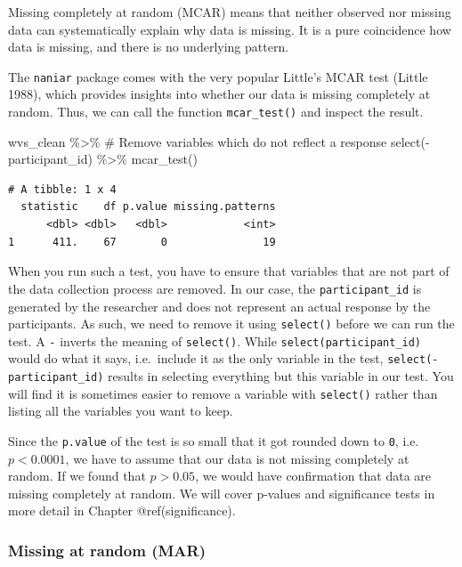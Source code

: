 \documentclass[
  letterpaper,
]{krantz}
\makeatletter
\newenvironment{Shaded}{\begin{snugshade}}{\end{snugshade}}
\newcommand{\CommentTok}[1]{\textcolor[rgb]{0.37,0.37,0.37}{#1}}
\newcommand{\FunctionTok}[1]{\textcolor[rgb]{0.28,0.35,0.67}{#1}}
\newcommand{\NormalTok}[1]{\textcolor[rgb]{0.00,0.23,0.31}{#1}}
\newcommand{\SpecialCharTok}[1]{\textcolor[rgb]{0.37,0.37,0.37}{#1}}
\newenvironment{kframe}{%
\medskip{}
\setlength{\fboxsep}{.8em}
 \def\at@end@of@kframe{}%
 \ifinner\ifhmode%
  \def\at@end@of@kframe{\end{minipage}}%
  \begin{minipage}{\columnwidth}%
 \fi\fi%
 \def\FrameCommand##1{\hskip\@totalleftmargin \hskip-\fboxsep
 \colorbox{shadecolor}{##1}\hskip-\fboxsep
     \hskip-\linewidth \hskip-\@totalleftmargin \hskip\columnwidth}%
 \MakeFramed {\advance\hsize-\width
   \@totalleftmargin\z@ \linewidth\hsize
   \@setminipage}}%
 {\par\unskip\endMakeFramed%
 \at@end@of@kframe}
\renewenvironment{Shaded}{\begin{kframe}}{\end{kframe}}
\makeatother
\begin{document}
Missing completely at random (MCAR) means that neither observed nor
missing data can systematically explain why data is missing. It is a
pure coincidence how data is missing, and there is no underlying
pattern.

The \texttt{naniar} package comes with the very popular Little's MCAR
test (Little 1988), which provides insights into whether our data is
missing completely at random. Thus, we can call the function
\texttt{mcar\_test()} and inspect the result.

\begin{Shaded}
\begin{Highlighting}[]
\NormalTok{wvs\_clean }\SpecialCharTok{\%\textgreater{}\%}
  \CommentTok{\# Remove variables which do not reflect a response}
  \FunctionTok{select}\NormalTok{(}\SpecialCharTok{{-}}\NormalTok{participant\_id) }\SpecialCharTok{\%\textgreater{}\%}
  \FunctionTok{mcar\_test}\NormalTok{()}
\end{Highlighting}
\end{Shaded}

\begin{verbatim}
# A tibble: 1 x 4
  statistic    df p.value missing.patterns
      <dbl> <dbl>   <dbl>            <int>
1      411.    67       0               19
\end{verbatim}

When you run such a test, you have to ensure that variables that are not
part of the data collection process are removed. In our case, the
\texttt{participant\_id} is generated by the researcher and does not
represent an actual response by the participants. As such, we need to
remove it using \texttt{select()} before we can run the test. A
\texttt{-} inverts the meaning of \texttt{select()}. While
\texttt{select(participant\_id)} would do what it says, i.e.~include it
as the only variable in the test, \texttt{select(-participant\_id)}
results in selecting everything but this variable in our test. You will
find it is sometimes easier to remove a variable with \texttt{select()}
rather than listing all the variables you want to keep.

Since the \texttt{p.value} of the test is so small that it got rounded
down to \texttt{0}, i.e.~\(p<0.0001\), we have to assume that our data
is not missing completely at random. If we found that \(p>0.05\), we
would have confirmation that data are missing completely at random. We
will cover p-values and significance tests in more detail in Chapter
@ref(significance).

\subsubsection{Missing at random (MAR)}\label{missing-at-random-mar}
\end{document}
